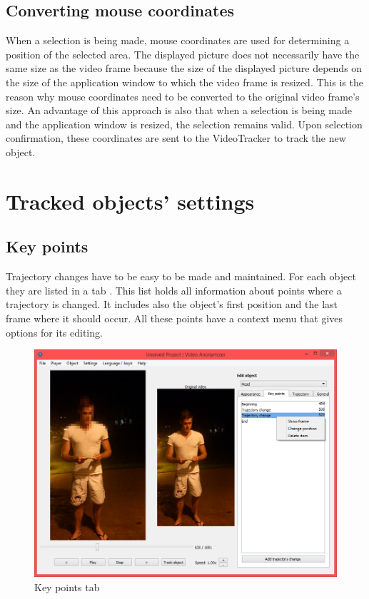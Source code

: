 \subsection{Converting mouse coordinates}
When a selection is being made, mouse coordinates are used for determining a position of the selected area. The displayed picture does not necessarily have the same size as the video frame because the size of the displayed picture depends on the size of the application window to which the video frame is resized. This is the reason why mouse coordinates need to be converted to the original video frame's size. An advantage of this approach is also that when a selection is being made and the application window is resized, the selection remains valid. Upon selection confirmation, these coordinates are sent to the VideoTracker to track the new object.

\section{Tracked objects' settings}
\subsection{Key points}
Trajectory changes have to be easy to be made and maintained. For each object they are listed in a tab . This list holds all information about points where a trajectory is changed. It includes also the object's first position and the last frame where it should occur. All these points have a context menu that gives options for its editing.
\begin{figure}[!htbp]
\centering
\includegraphics[width=\textwidth]{png/key_points}
\caption{Key points tab}
\label{fig:key_points}
\end{figure}


